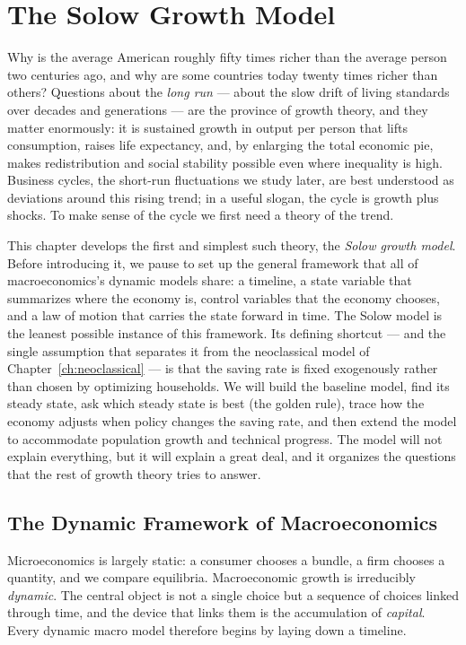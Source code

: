 \chapter{The Solow Growth Model}
\label{ch:solow}

Why is the average American roughly fifty times richer than the average person two centuries ago, and why are some countries today twenty times richer than others? Questions about the \emph{long run} --- about the slow drift of living standards over decades and generations --- are the province of growth theory, and they matter enormously: it is sustained growth in output per person that lifts consumption, raises life expectancy, and, by enlarging the total economic pie, makes redistribution and social stability possible even where inequality is high. Business cycles, the short-run fluctuations we study later, are best understood as deviations around this rising trend; in a useful slogan, the cycle is growth plus shocks. To make sense of the cycle we first need a theory of the trend.

This chapter develops the first and simplest such theory, the \emph{Solow growth model}. Before introducing it, we pause to set up the general framework that all of macroeconomics's dynamic models share: a timeline, a state variable that summarizes where the economy is, control variables that the economy chooses, and a law of motion that carries the state forward in time. The Solow model is the leanest possible instance of this framework. Its defining shortcut --- and the single assumption that separates it from the neoclassical model of Chapter~\ref{ch:neoclassical} --- is that the saving rate is fixed exogenously rather than chosen by optimizing households. We will build the baseline model, find its steady state, ask which steady state is best (the golden rule), trace how the economy adjusts when policy changes the saving rate, and then extend the model to accommodate population growth and technical progress. The model will not explain everything, but it will explain a great deal, and it organizes the questions that the rest of growth theory tries to answer.

\section{The Dynamic Framework of Macroeconomics}

Microeconomics is largely static: a consumer chooses a bundle, a firm chooses a quantity, and we compare equilibria. Macroeconomic growth is irreducibly \emph{dynamic}. The central object is not a single choice but a sequence of choices linked through time, and the device that links them is the accumulation of \emph{capital}. Every dynamic macro model therefore begins by laying down a timeline.

